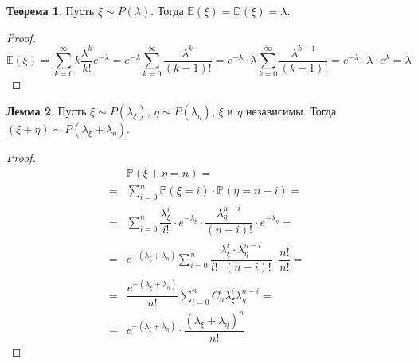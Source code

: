 \documentclass[12pt]{article}
\theoremstyle{definition}
\newtheorem{theorem}{Теорема}[section]
\newtheorem{lemma}[theorem]{Лемма}
\newcommand{\E}{\mathbb{E}}
\newcommand{\D}{\mathbb{D}}
\newcommand{\prob}{\mathbb{P}}
\begin{document}
\begin{theorem}
    Пусть $\xi\sim P(\lambda)$. Тогда $\E(\xi)=\D(\xi)=\lambda$.
\end{theorem}
\begin{proof}
    $$\E(\xi)=\sum_{k=0}^{\infty}k\dfrac{\lambda^k}{k!}e^{-\lambda}=e^{-\lambda}\sum_{k=0}^{\infty}\dfrac{\lambda^k}{(k-1)!}=e^{-\lambda}\cdot\lambda\sum_{k=0}^{\infty}\dfrac{\lambda^{k-1}}{(k-1)!}=e^{-\lambda}\cdot\lambda\cdot e^\lambda=\lambda$$
\end{proof}
\begin{lemma}
    Пусть $\xi\sim P(\lambda_\xi)$, $\eta\sim P(\lambda_\eta)$, $\xi$ и $\eta$ независимы. Тогда $(\xi+\eta)\sim P(\lambda_\xi+\lambda_\eta)$.
\end{lemma}
\begin{proof}
    \begin{align*}
        &\prob(\xi+\eta=n)=\\
        =&\sum_{i=0}^{n}\prob(\xi=i)\cdot\prob(\eta=n-i)=\\
        =&\sum_{i=0}^{n}\dfrac{\lambda_\xi^i}{i!}\cdot e^{-\lambda_\xi}\cdot \dfrac{\lambda_\eta^{n-i}}{(n-i)!}\cdot e^{-\lambda_\eta}=\\
        =&e^{-(\lambda_\xi+\lambda_\eta)}\sum_{i=0}^{n}\dfrac{\lambda_\xi^i\cdot\lambda_\eta^{n-i}}{i!\cdot(n-i)!}\cdot \dfrac{n!}{n!}=\\
        =&\dfrac{e^{-(\lambda_\xi+\lambda_\eta)}}{n!}\sum_{i=0}^{n}C_n^i\lambda_\xi^i\lambda_\eta^{n-i}=\\
        =&e^{-(\lambda_\xi+\lambda_\eta)}\cdot \dfrac{(\lambda_\xi+\lambda_\eta)^n}{n!}
    \end{align*}
\end{proof}
\end{document}
